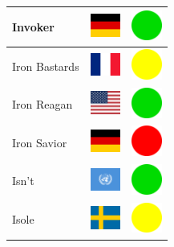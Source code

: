 \documentclass[12pt, a4paper, twoside]{report}
\begin{document}
\begin{center}
\begin{longtable}{|p{5cm}|p{2cm}|p{2cm}|}
 Invoker                                                    & \includegraphics[width=1cm]{4x3/de} &   \includegraphics[width=1cm]{likes/y} \\ \hline
 Iron Bastards                                              & \includegraphics[width=1cm]{4x3/fr} &   \includegraphics[width=1cm]{likes/m} \\ \hline
 Iron Reagan                                                & \includegraphics[width=1cm]{4x3/us} &   \includegraphics[width=1cm]{likes/y} \\ \hline
 Iron Savior                                                & \includegraphics[width=1cm]{4x3/de} &   \includegraphics[width=1cm]{likes/n} \\ \hline
 Isn't                                                      & \includegraphics[width=1cm]{4x3/un} &   \includegraphics[width=1cm]{likes/y} \\ \hline
 Isole                                                      & \includegraphics[width=1cm]{4x3/se} &   \includegraphics[width=1cm]{likes/m} \\ \hline

\end{longtable}
\end{center}
\end{document}
